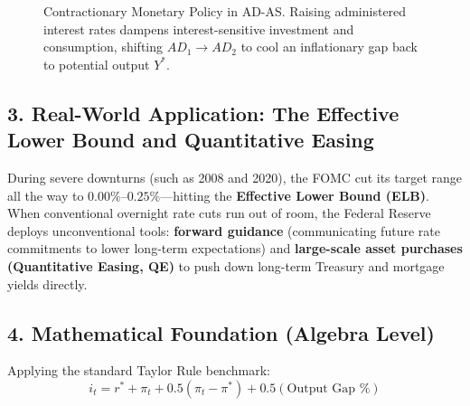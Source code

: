 \documentclass[11pt,letterpaper]{article}
\begin{document}
\begin{figure}[htbp]
\centering
{}
\caption{Contractionary Monetary Policy in AD-AS. Raising administered interest rates dampens interest-sensitive investment and consumption, shifting $AD_1 \to AD_2$ to cool an inflationary gap back to potential output $Y^*$.}
\label{fig:monetary_transmission_adas}
\end{figure}

\subsection*{3. Real-World Application: The Effective Lower Bound and Quantitative Easing}
During severe downturns (such as 2008 and 2020), the FOMC cut its target range all the way to $0.00\%\text{--}0.25\%$—hitting the \textbf{Effective Lower Bound (ELB)}. When conventional overnight rate cuts run out of room, the Federal Reserve deploys unconventional tools: \textbf{forward guidance} (communicating future rate commitments to lower long-term expectations) and \textbf{large-scale asset purchases (Quantitative Easing, QE)} to push down long-term Treasury and mortgage yields directly.

\subsection*{4. Mathematical Foundation (Algebra Level)}
Applying the standard Taylor Rule benchmark:
\begin{equation}
i_t = r^* + \pi_t + 0.5(\pi_t - \pi^*) + 0.5(\text{Output Gap } \%)
\end{equation}
\end{document}
